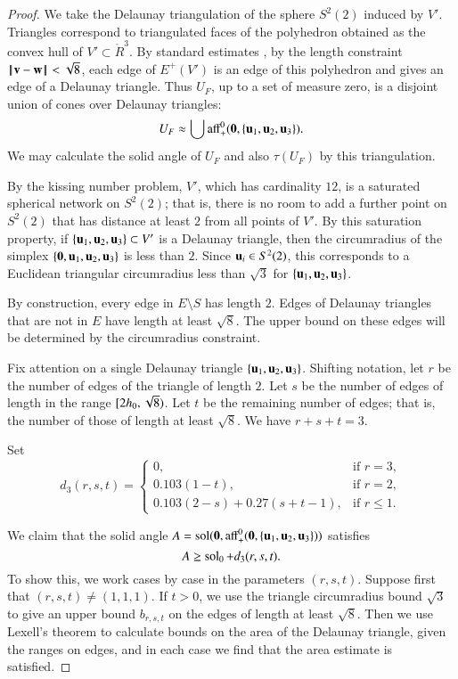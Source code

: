 \documentclass{llncs}
\def\op#1{{\hbox{#1}}}
\begin{document}
\begin{proof}  
  We take the Delaunay triangulation of the sphere $S^2(2)$ induced by $V'$.  
Triangles correspond to triangulated faces of the polyhedron obtained as 
the convex hull of $V'\subset\ring{R}^3$.  By standard estimates 
\cite{DSP}, by the length constraint $\norm{\v}{\w}<\sqrt8$, 
each edge of $E^+(V')$ is an edge of this polyhedron and 
gives an edge of a Delaunay triangle.  Thus $U_F$, up to a set of measure zero, 
is a disjoint union of cones over Delaunay triangles:
\[
U_F \approx \bigcup \op{aff}_+^0(\orz,\{\u_1,\u_2,\u_3\}).
\]
We may calculate the solid angle of $U_F$ and also $\tau(U_F)$ by this triangulation.

By the kissing number problem, $V'$, which has cardinality $12$, is a saturated spherical network on $S^2(2)$;
that is, there is no room to add a further point on $S^2(2)$ that has distance at least $2$ from all points
of $V'$.  By this saturation property, if $\{{\mathbf u}_1,{\mathbf u}_2,{\mathbf u}_3\}\subset V'$ is a Delaunay triangle, then
the circumradius of the simplex $\{{\mathbf 0},{\mathbf u}_1,{\mathbf u}_2,{\mathbf u}_3\}$ is less than $2$.  Since ${\mathbf u}_i\in S^2(2)$, this
corresponds to a Euclidean triangular circumradius less than $\sqrt3$ for $\{{\mathbf u}_1,{\mathbf u}_2,{\mathbf u}_3\}$.

By construction,  every edge in $E\setminus S$ has length $2$.
Edges of Delaunay triangles that are not in $E$ have length at least $\sqrt8$.  The upper bound
on these edges will be determined by the circumradius constraint.

Fix attention on a single Delaunay triangle $\{{\mathbf u}_1,{\mathbf u}_2,{\mathbf u}_3\}$. Shifting notation,
let $r$ be the number of edges of the triangle of length $2$.  Let $s$ be the number of edges
of length in the range $[ 2h_0,\sqrt8)$.  Let $t$ be the remaining number of edges; 
that is, the number of those of length at least $\sqrt8$.  We have $r+s+t=3$.

Set
\[
d_3(r,s,t) = 
\begin{cases}
0, & \text{if } r=3,\\
0.103 (1 - t), &\text{if } r=2,\\
0.103 (2 - s) + 0.27 (s+t-1),&\text{if } r \le 1.
\end{cases}
\]

We claim that the solid angle $A=\op{sol}(\orz,\op{aff}_+^0(\orz,\{\u_1,\u_2,\u_3\}))$ satisfies
\begin{equation}\label{eqn:d3}
A\ge \operatorname{sol}_0 + d_3(r,s,t).
\end{equation}
To show this, we work cases by case in the parameters $(r,s,t)$.
Suppose first that $(r,s,t)\ne (1,1,1)$.
If $t>0$, we use the triangle circumradius bound $\sqrt3$ 
to give an upper bound $b_{r,s,t}$ on the edges of length at least $\sqrt8$.
Then we use Lexell's theorem to calculate bounds on the area of the Delaunay triangle,
given the ranges on edges, and in each case we find that the area estimate is satisfied.


\end{proof}
\end{document}
